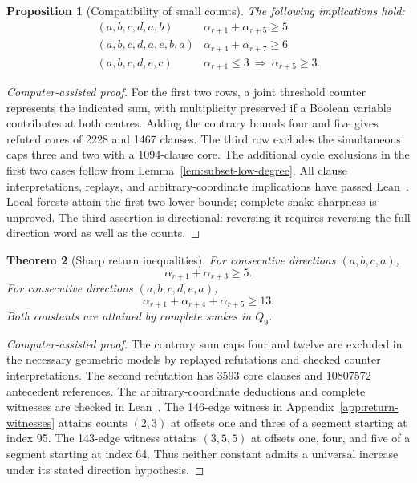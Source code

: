 \documentclass[11pt,a4paper]{article}
\newtheorem{theorem}{Theorem}[section]
\newtheorem{proposition}[theorem]{Proposition}
\theoremstyle{definition}
\theoremstyle{remark}
\newcommand{\Q}{Q}
\begin{document}
\begin{proposition}[Compatibility of small counts]\label{prop:small-count-compatibility}
The following implications hold:
\[
\begin{array}{c|l}
(a,b,c,d,a,b)&\alpha_{r+1}+\alpha_{r+5}\ge5\\
(a,b,c,d,a,e,b,a)&\alpha_{r+4}+\alpha_{r+7}\ge6\\
(a,b,c,d,e,c)&\alpha_{r+1}\le3\ \Longrightarrow\ \alpha_{r+5}\ge3.
\end{array}
\]
\end{proposition}
\begin{proof}[Computer-assisted proof]
For the first two rows, a joint threshold counter represents the indicated sum, with multiplicity preserved if a Boolean variable contributes at both centres. Adding the contrary bounds four and five gives refuted cores of 2228 and 1467 clauses. The third row excludes the simultaneous caps three and two with a 1094-clause core. The additional cycle exclusions in the first two cases follow from Lemma~\ref{lem:subset-low-degree}. All clause interpretations, replays, and arbitrary-coordinate implications have passed Lean~\cite{recentarchive}. Local forests attain the first two lower bounds; complete-snake sharpness is unproved. The third assertion is directional: reversing it requires reversing the full direction word as well as the counts.
\end{proof}

\begin{theorem}[Sharp return inequalities]\label{thm:sharp-returns}
For consecutive directions $(a,b,c,a)$,
\[
\alpha_{r+1}+\alpha_{r+3}\ge5.
\]
For consecutive directions $(a,b,c,d,e,a)$,
\[
\alpha_{r+1}+\alpha_{r+4}+\alpha_{r+5}\ge13.
\]
Both constants are attained by complete snakes in $\Q_9$.
\end{theorem}
\begin{proof}[Computer-assisted proof]
The contrary sum caps four and twelve are excluded in the necessary geometric models by replayed refutations and checked counter interpretations. The second refutation has 3593 core clauses and 10807572 antecedent references. The arbitrary-coordinate deductions and complete witnesses are checked in Lean~\cite{recentarchive}. The 146-edge witness in Appendix~\ref{app:return-witnesses} attains counts $(2,3)$ at offsets one and three of a segment starting at index 95. The 143-edge witness attains $(3,5,5)$ at offsets one, four, and five of a segment starting at index 64. Thus neither constant admits a universal increase under its stated direction hypothesis.
\end{proof}
\end{document}
